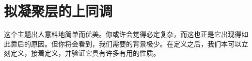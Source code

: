 
\chapter{拟凝聚层的\trCech{}上同调}
\label{ch:cech-cohomology}

这个主题出人意料地简单而优美。你或许会觉得\trCohomology{}必定复杂，而这也正是它出现得如此靠后的原因。但你将会看到，我们需要的背景极少。在定义\trScheme{}之后，我们本可以立刻定义\trQCSheaf，接着定义\trCohomology，并验证它具有许多有用的性质。










